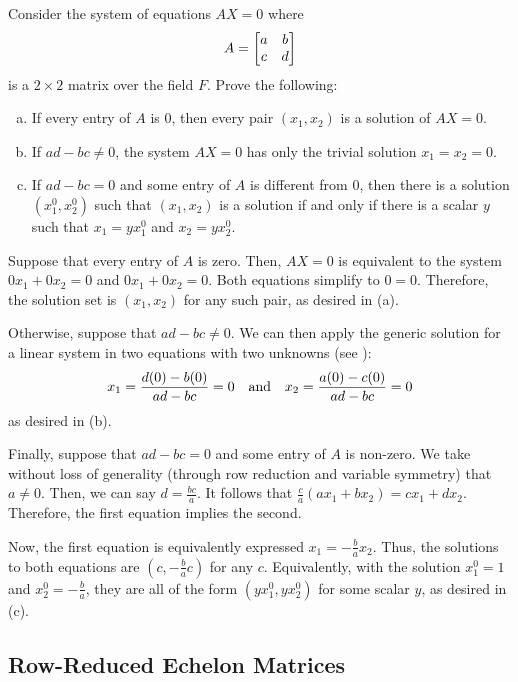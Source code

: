 \documentclass{agony}
\begin{document}
\begin{xca}
  Consider the system of equations $AX = 0$ where \[ A = \mqty[a&b \\ c&d] \]
  is a $2 \times 2$ matrix over the field $F$. Prove the following:
  \setlength\parskip{0pt}
  \begin{enumerate}[(a)]
    \item If every entry of $A$ is 0, then every pair $(x_1, x_2)$ is a solution of $AX = 0$.
    \item If $ad-bc \neq 0$, the system $AX = 0$ has only the trivial solution $x_1 = x_2 = 0$.
    \item If $ad-bc = 0$ and some entry of $A$ is different from 0,
          then there is a solution $(x_1^0, x_2^0)$ such that
          $(x_1, x_2)$ is a solution if and only if there is a scalar $y$ such that
          $x_1 = yx_1^0$ and $x_2 = yx_2^0$.
  \end{enumerate}
\end{xca}
\begin{prf}
  Suppose that every entry of $A$ is zero.
  Then, $AX = 0$ is equivalent to the system $0x_1 + 0x_2 = 0$ and $0x_1 + 0x_2 = 0$.
  Both equations simplify to $0 = 0$.
  Therefore, the solution set is $(x_1, x_2)$ for any such pair, as desired in (a).

  Otherwise, suppose that $ad - bc \neq 0$.
  We can then apply the generic solution for a linear system in two equations with two unknowns
  (see ):
  \[ x_1 = \frac{d(0) - b(0)}{ad - bc} = 0 \qq{and} x_2 = \frac{a(0) - c(0)}{ad - bc} = 0 \]
  as desired in (b).

  Finally, suppose that $ad - bc = 0$ and some entry of $A$ is non-zero.
  We take without loss of generality (through row reduction and variable symmetry) that $a \neq 0$.
  Then, we can say $d = \frac{bc}{a}$.
  It follows that $\frac{c}{a}(ax_1 + bx_2) = cx_1 + dx_2$.
  Therefore, the first equation implies the second.

  Now, the first equation is equivalently expressed $x_1 = -\frac{b}{a}x_2$.
  Thus, the solutions to both equations are $(c, -\frac{b}{a}c)$ for any $c$.
  Equivalently, with the solution $x_1^0 = 1$ and $x_2^0 = -\frac{b}{a}$,
  they are all of the form $(yx_1^0, yx_2^0)$ for some scalar $y$, as desired in (c).
\end{prf}

\subsection{Row-Reduced Echelon Matrices}
\end{document}
